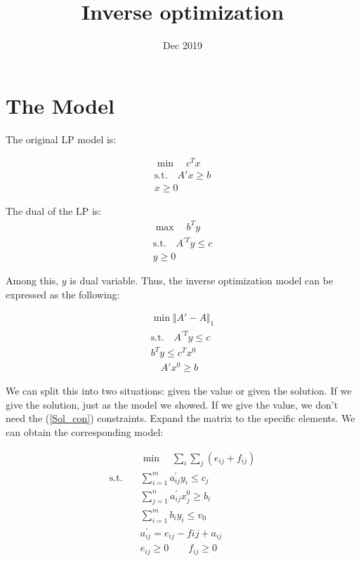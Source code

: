 \documentclass[UTF8]{article}
\title{Inverse optimization}
\date{Dec 2019}
\numberwithin{equation}{section}
\begin{document}
\maketitle{}

\section{The Model}

The original LP model is:

\begin{equation}
\begin{align*}
  \min \quad c^Tx \\
\text{s.t.} \quad A'x \geq b  \\
x \geq 0
\end{align*}
\end{equation}

The dual of the LP is:
\begin{equation}
\begin{align*}
  \max \quad b^Ty \\
\text{s.t.} \quad A^{'T}y \leq c  \\
y \geq 0
\end{align*}
\end{equation}

Among this, $y$ is dual variable.
Thus, the inverse optimization model can be expressed as the following:

\begin{align}
  \min \Vert A'-A \Vert_1 \nonumber \\
\mathrm{s.t.}  \quad A^{'T}y \leq c  \\
  b^Ty \leq c^Tx^0  \\
  \quad A'x^0 \geq b \label{Sol_con}
\end{align}

We can split this into two situations: given the value or given the solution. If we give the solution, just as the model we showed. If we give the value, we don't need the (\ref{Sol_con}) constraints.
Expand the matrix to the specific elements. We can obtain the corresponding model:

\begin{equation}
\begin{align*}
& \min \quad \sum_i \sum_j (e_{ij}+f_{ij})\\
\mathrm{s.t.} \quad &\sum_{i=1}^m a^{'}_{ij} y_i \leq c_j \\
&\sum_{j=1}^n a^{'}_{ij} x_j^0 \geq b_i \\
&\sum_{i=1}^m b_i y_i \leq v_0 \\
&a^{'}_{ij} = e_{ij}-f{ij}+a_{ij} \\
&e_{ij} \geq 0 \qquad f_{ij} \geq 0
\end{align*}
\end{equation}
\end{document}
